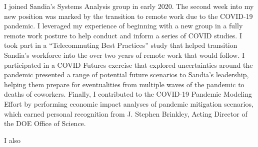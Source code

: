 \documentclass[11pt]{article}
\begin{document}
I joined Sandia's Systems Analysis group in early 2020. The second week into my new position was marked by the transition to remote work due to the COVID-19 pandemic. I leveraged my experience of beginning with a new group in a fully remote work posture to help conduct and inform a series of COVID studies. I took part in a ``Telecommuting Best Practices'' study that helped transition Sandia's workforce into the over two years of remote work that would follow. I participated in a COVID Futures exercise that explored uncertainties around the pandemic presented a range of potential future scenarios to Sandia's leadership, helping them prepare for eventualities from multiple waves of the pandemic to deaths of coworkers. Finally, I contributed to the COVID-19 Pandemic Modeling Effort by performing economic impact analyses of pandemic mitigation scenarios, which earned personal recognition from J. Stephen Brinkley, Acting Director of the DOE Office of Science.

I also 
\end{document}
